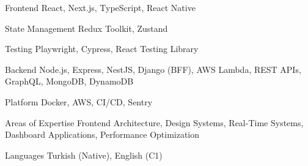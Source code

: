 \begin{cvskills}

\cvskill
{Frontend}
{React, Next.js, TypeScript, React Native}

\cvskill
{State Management}
{Redux Toolkit, Zustand}

\cvskill
{Testing}
{Playwright, Cypress, React Testing Library}

\cvskill
{Backend}
{Node.js, Express, NestJS, Django (BFF), AWS Lambda, REST APIs, GraphQL, MongoDB, DynamoDB}

\cvskill
{Platform}
{Docker, AWS, CI/CD, Sentry}

\cvskill
{Areas of Expertise}
{Frontend Architecture, Design Systems, Real-Time Systems, Dashboard Applications, Performance Optimization}

\cvskill
{Languages}
{Turkish (Native), English (C1)}

\end{cvskills}
